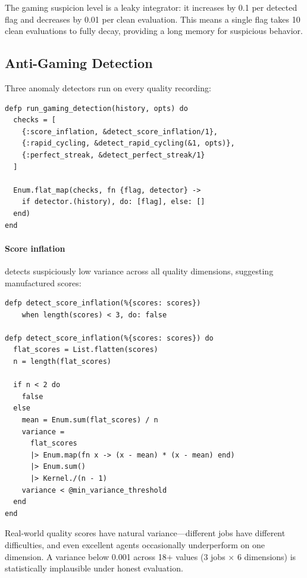 \documentclass[12pt,a4paper]{article}
\theoremstyle{plain}
\theoremstyle{definition}
\begin{document}
The gaming suspicion level is a leaky integrator: it increases by 0.1 per detected flag and decreases by 0.01 per clean evaluation. This means a single flag takes 10 clean evaluations to fully decay, providing a long memory for suspicious behavior.

\subsection{Anti-Gaming Detection}

Three anomaly detectors run on every quality recording:

\begin{lstlisting}[caption={Anti-gaming detection pipeline},label={lst:rep-gaming}]
defp run_gaming_detection(history, opts) do
  checks = [
    {:score_inflation, &detect_score_inflation/1},
    {:rapid_cycling, &detect_rapid_cycling(&1, opts)},
    {:perfect_streak, &detect_perfect_streak/1}
  ]

  Enum.flat_map(checks, fn {flag, detector} ->
    if detector.(history), do: [flag], else: []
  end)
end
\end{lstlisting}

\paragraph{Score inflation} detects suspiciously low variance across all quality dimensions, suggesting manufactured scores:

\begin{lstlisting}[caption={Score inflation detection},label={lst:rep-inflation}]
defp detect_score_inflation(%{scores: scores})
    when length(scores) < 3, do: false

defp detect_score_inflation(%{scores: scores}) do
  flat_scores = List.flatten(scores)
  n = length(flat_scores)

  if n < 2 do
    false
  else
    mean = Enum.sum(flat_scores) / n
    variance =
      flat_scores
      |> Enum.map(fn x -> (x - mean) * (x - mean) end)
      |> Enum.sum()
      |> Kernel./(n - 1)
    variance < @min_variance_threshold
  end
end
\end{lstlisting}

Real-world quality scores have natural variance---different jobs have different difficulties, and even excellent agents occasionally underperform on one dimension. A variance below 0.001 across 18+ values (3 jobs $\times$ 6 dimensions) is statistically implausible under honest evaluation.
\end{document}
